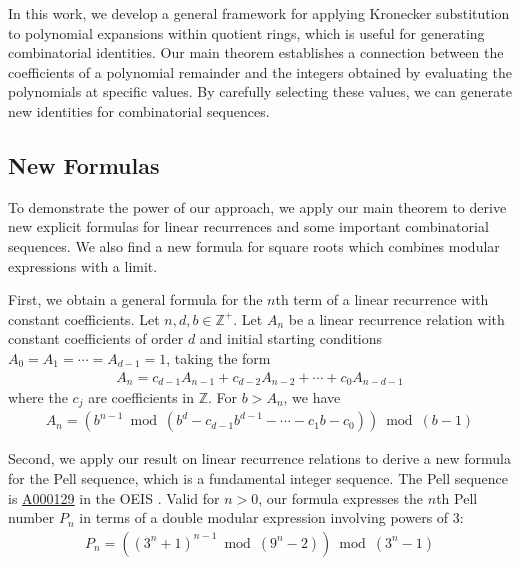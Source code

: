 \documentclass[11pt,reqno]{article}
\theoremstyle{plain}
\theoremstyle{definition}
\newcommand{\seqnum}[1]{\href{https://oeis.org/#1}{\rm \underline{#1}}}
\begin{document}
In this work, we develop a general framework for applying Kronecker substitution to polynomial expansions within quotient rings, which is useful for generating combinatorial identities. Our main theorem establishes a connection between the coefficients of a polynomial remainder and the integers obtained by evaluating the polynomials at specific values. By carefully selecting these values, we can generate new identities for combinatorial sequences.

\subsection{New Formulas}
To demonstrate the power of our approach, we apply our main theorem to derive new explicit formulas for linear recurrences and some important combinatorial sequences. We also find a new formula for square roots which combines modular expressions with a limit.

First, we obtain a general formula for the $n$th term of a linear recurrence with constant coefficients. Let $n,d,b \in \mathbb{Z}^+$. Let $A_n$ be a linear recurrence relation with constant coefficients of order $d$ and initial starting conditions $A_0=A_1=\cdots=A_{d-1}=1$, taking the form
\begin{align*}
    A_{n} = c_{d-1} A_{n-1} + c_{d-2} A_{n-2} + \cdots + c_{0} A_{n-d-1}
\end{align*}
where the $c_j$ are coefficients in $\mathbb{Z}$. For $b > A_n$, we have
\begin{align*}
    A_{n} = (b^{n-1} \bmod{(b^d - c_{d-1} b^{d-1} - \cdots -  c_1 b - c_0 )}) \bmod{(b-1)}
\end{align*}

Second, we apply our result on linear recurrence relations to derive a new formula for the Pell sequence, which is a fundamental integer sequence. The Pell sequence is \seqnum{A000129} in the OEIS \cite{A000129}. Valid for $n > 0$, our formula expresses the $n$th Pell number $P_n$ in terms of a double modular expression involving powers of $3$:
\begin{align*}
    P_n = ((3^{n}+1)^{n-1} \bmod{(9^n-2)}) \bmod{(3^n-1)}
\end{align*}
\end{document}
